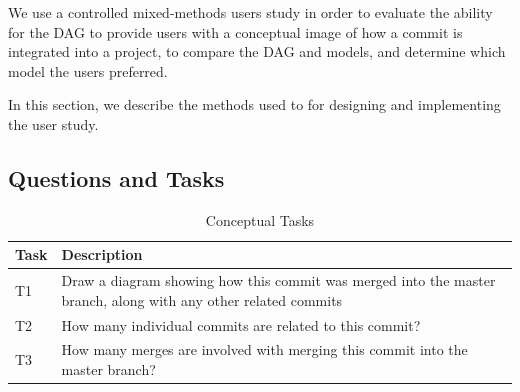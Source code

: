 


We use a controlled mixed-methods users study in order to evaluate the
ability for the DAG to provide users with a conceptual image of how a
commit is integrated into a project, to compare the DAG and \mt models,
and determine which model the users preferred.

In this section, we describe the methods used to for designing and
implementing the user study.


\subsection{Questions and Tasks}
\label{sub:questions}



\begin{table}[htpb]
  \centering
  \caption{Conceptual Tasks }
  \label{tab:conceptual_tasks}
  \begin{tabulary}{0.9\textwidth}{LL}
    \toprule
    Task & Description\\
    \midrule
    T1 & Draw a diagram showing how this commit was merged into the master branch, along with any other related commits\\
    T2 & How many individual commits are related to this commit?\\
    T3 & How many merges are involved with merging this commit into the master branch?\\
    \bottomrule
  \end{tabulary}
\end{table}

